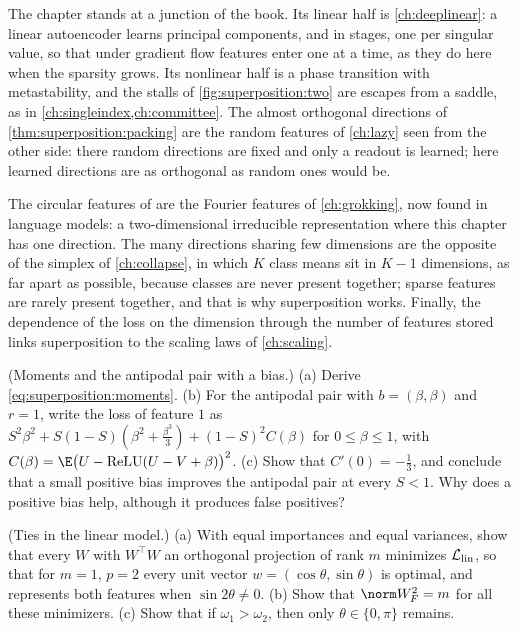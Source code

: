 \begin{refsection}
The chapter stands at a junction of the book. Its linear half is \cref{ch:deeplinear}: a linear autoencoder learns principal components, and in stages, one per singular value, so that under gradient flow features enter one at a time, as they do here when the sparsity grows. Its nonlinear half is a phase transition with metastability, and the stalls of \cref{fig:superposition:two} are escapes from a saddle, as in \cref{ch:singleindex,ch:committee}. The almost orthogonal directions of \cref{thm:superposition:packing} are the random features of \cref{ch:lazy} seen from the other side: there random directions are fixed and only a readout is learned; here learned directions are as orthogonal as random ones would be.

The circular features of \textcite{EngelsEtAl2025} are the Fourier features of \cref{ch:grokking}, now found in language models: a two-dimensional irreducible representation where this chapter has one direction. The many directions sharing few dimensions are the opposite of the simplex of \cref{ch:collapse}, in which $K$ class means sit in $K-1$ dimensions, as far apart as possible, because classes are never present together; sparse features are rarely present together, and that is why superposition works. Finally, the dependence of the loss on the dimension through the number of features stored links superposition to the scaling laws of \cref{ch:scaling}.

\begin{exercises}
\item \consolidation (Moments and the antipodal pair with a bias.) (a) Derive \eqref{eq:superposition:moments}. (b) For the antipodal pair with $b=(\beta,\beta)$ and $r=1$, write the loss of feature $1$ as $S^2\beta^2+S(1-S)(\beta^2+\frac{\beta^3}3)+(1-S)^2C(\beta)$ for $0\le\beta\le1$, with $C(\beta)=\E\bigl(U-\relu(U-V+\beta)\bigr)^2$. (c) Show that $C'(0)=-\frac13$, and conclude that a small positive bias improves the antipodal pair at every $S<1$. Why does a positive bias help, although it produces false positives? \label{ex:superposition:antibias}

\item \consolidation (Ties in the linear model.) (a) With equal importances and equal variances, show that every $W$ with $W^\top W$ an orthogonal projection of rank $m$ minimizes $\mathcal{L}_{\mathrm{lin}}$, so that for $m=1$, $p=2$ every unit vector $w=(\cos\theta,\sin\theta)$ is optimal, and represents both features when $\sin2\theta\ne0$. (b) Show that $\norm W_F^2=m$ for all these minimizers. (c) Show that if $\omega_1>\omega_2$, then only $\theta\in\{0,\pi\}$ remains. \label{ex:superposition:ties}


\end{exercises}
\end{refsection}
